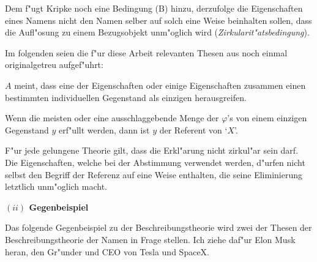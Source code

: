 \documentclass[a4paper, emulatestandardclasses, 12pt]{scrartcl}
\begin{document}
\begin{onehalfspace}
Dem f"ugt Kripke noch eine Bedingung (B) hinzu, derzufolge die Eigenschaften eines Namens nicht den Namen selber auf solch eine Weise beinhalten sollen, dass die Aufl"osung zu einem Bezugsobjekt unm"oglich wird (\emph{Zirkularit"atsbedingung}).%

\noindent Im folgenden seien die f"ur diese Arbeit relevanten Thesen aus \citep{kripke1972naming} noch einmal originalgetreu aufgef"uhrt:\vspace{5mm}

\begin{addmargin}[.065\linewidth]{.065\linewidth}%
\footnotesize
\begin{description}[leftmargin=!,labelwidth=\widthof{\bfseries (B)}]
    \item[(2)] $A$ meint, dass eine der Eigenschaften oder einige Eigenschaften zusammen einen bestimmten individuellen Gegenstand als einzigen herausgreifen.
    \item[(3)] Wenn die meisten oder eine ausschlaggebende Menge der $\varphi$'s von einem einzigen Gegenstand $y$ erf"ullt werden, dann ist $y$ der Referent von `$X$'.
    \item[(B)] F"ur jede gelungene Theorie gilt, dass die Erkl"arung nicht zirkul"ar sein darf. Die Eigenschaften, welche bei der Abstimmung verwendet werden, d"urfen nicht selbst den Begriff der Referenz auf eine Weise enthalten, die seine Eliminierung letztlich unm"oglich macht.
\end{description}
\end{addmargin}
\normalsize

\vspace{3mm}
\noindent\textbf{$(ii)$ Gegenbeispiel}	

\noindent Das folgende Gegenbeispiel zu der Beschreibungstheorie wird zwei der Thesen der Beschreibungstheorie der Namen in Frage stellen. Ich ziehe daf"ur Elon Musk heran, den Gr"under und CEO von Tesla und SpaceX. 


\end{onehalfspace}
\end{document}
